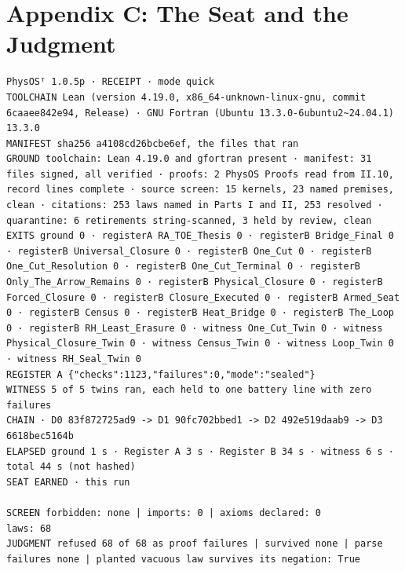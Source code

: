 \documentclass[10pt]{article}
\begin{document}
\hypertarget{appendix-c-the-seat-and-the-judgment}{%
\section{Appendix C: The Seat and the
Judgment}\label{appendix-c-the-seat-and-the-judgment}}

\begin{Verbatim}[fontsize=\fontsize{5.4}{6.2}\selectfont,breaklines,breakanywhere,breaksymbolleft={}]
PhysOSᵀ 1.0.5p · RECEIPT · mode quick
TOOLCHAIN Lean (version 4.19.0, x86_64-unknown-linux-gnu, commit 6caaee842e94, Release) · GNU Fortran (Ubuntu 13.3.0-6ubuntu2~24.04.1) 13.3.0
MANIFEST sha256 a4108cd26bcbe6ef, the files that ran
GROUND toolchain: Lean 4.19.0 and gfortran present · manifest: 31 files signed, all verified · proofs: 2 PhysOS Proofs read from II.10, record lines complete · source screen: 15 kernels, 23 named premises, clean · citations: 253 laws named in Parts I and II, 253 resolved · quarantine: 6 retirements string-scanned, 3 held by review, clean
EXITS ground 0 · registerA RA_TOE_Thesis 0 · registerB Bridge_Final 0 · registerB Universal_Closure 0 · registerB One_Cut 0 · registerB One_Cut_Resolution 0 · registerB One_Cut_Terminal 0 · registerB Only_The_Arrow_Remains 0 · registerB Physical_Closure 0 · registerB Forced_Closure 0 · registerB Closure_Executed 0 · registerB Armed_Seat 0 · registerB Census 0 · registerB Heat_Bridge 0 · registerB The_Loop 0 · registerB RH_Least_Erasure 0 · witness One_Cut_Twin 0 · witness Physical_Closure_Twin 0 · witness Census_Twin 0 · witness Loop_Twin 0 · witness RH_Seal_Twin 0
REGISTER A {"checks":1123,"failures":0,"mode":"sealed"}
WITNESS 5 of 5 twins ran, each held to one battery line with zero failures
CHAIN · D0 83f872725ad9 -> D1 90fc702bbed1 -> D2 492e519daab9 -> D3 6618bec5164b
ELAPSED ground 1 s · Register A 3 s · Register B 34 s · witness 6 s · total 44 s (not hashed)
SEAT EARNED · this run

SCREEN forbidden: none | imports: 0 | axioms declared: 0
laws: 68
JUDGMENT refused 68 of 68 as proof failures | survived none | parse failures none | planted vacuous law survives its negation: True
\end{Verbatim}
\end{document}
